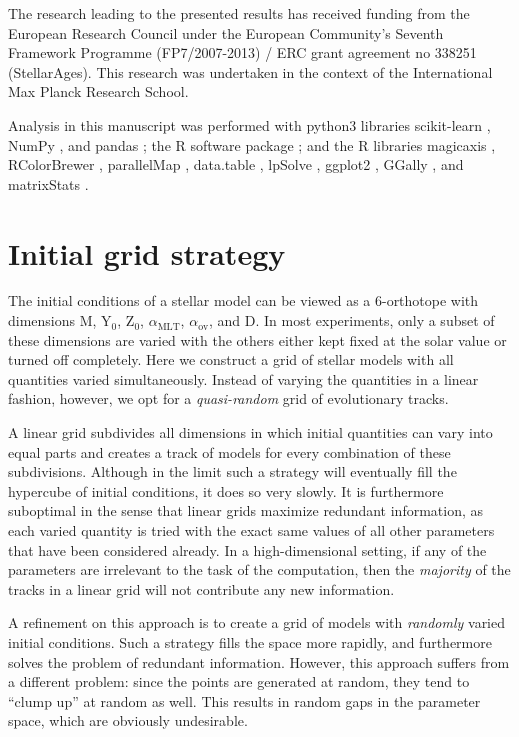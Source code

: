 \documentclass[manuscript]{aastex}
\begin{document}
\acknowledgments The research leading to the presented results has received funding from the European Research Council under the European Community's Seventh Framework Programme (FP7/2007-2013) / ERC grant agreement no 338251 (StellarAges). This research was undertaken in the context of the International Max Planck Research School. 

Analysis in this manuscript was performed with python3 libraries scikit-learn \citep{scikit-learn}, NumPy \citep{van2011numpy}, and pandas \citep{mckinney2010data}; the R software package \citep{R}; and the R libraries magicaxis \citep{magicaxis}, RColorBrewer \citep{RColorBrewer}, parallelMap \citep{parallelMap}, data.table \citep{data.table}, lpSolve \citep{lpSolve}, ggplot2 \citep{ggplot2}, GGally \citep{GGally}, and matrixStats \citep{matrixStats}. 

\appendix

\section{Initial grid strategy}
\label{sec:grid}
The initial conditions of a stellar model can be viewed as a 6-orthotope with dimensions M, Y$_0$, Z$_0$, $\alpha_{\text{MLT}}$, $\alpha_{\text{ov}}$, and D. In most experiments, only a subset of these dimensions are varied with the others either kept fixed at the solar value or turned off completely. Here we construct a grid of stellar models with all quantities varied simultaneously. Instead of varying the quantities in a linear fashion, however, we opt for a \emph{quasi-random} grid of evolutionary tracks. 

A linear grid subdivides all dimensions in which initial quantities can vary into equal parts and creates a track of models for every combination of these subdivisions. Although in the limit such a strategy will eventually fill the hypercube of initial conditions, it does so very slowly. It is furthermore suboptimal in the sense that linear grids maximize redundant information, as each varied quantity is tried with the exact same values of all other parameters that have been considered already. In a high-dimensional setting, if any of the parameters are irrelevant to the task of the computation, then the \emph{majority} of the tracks in a linear grid will not contribute any new information.

A refinement on this approach is to create a grid of models with \emph{randomly} varied initial conditions. Such a strategy fills the space more rapidly, and furthermore solves the problem of redundant information. However, this approach suffers from a different problem: since the points are generated at random, they tend to ``clump up'' at random as well. This results in random gaps in the parameter space, which are obviously undesirable. %
\end{document}
